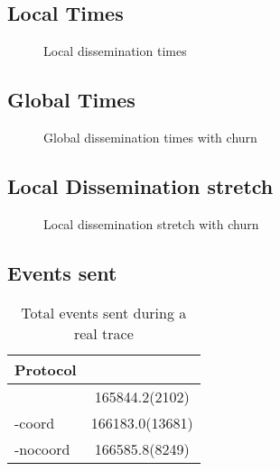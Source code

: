 \subsection{Local Times}
\label{sub:local-times}
\begin{figure}[htp]
	\centering
	
	\vspace{-2mm} 
	\caption{Local dissemination times}
	\vspace{-2mm}
	\label{fig:local-times-real-churn} 
\end{figure}

\newpage
\subsection{Global Times}

\begin{figure}[htp]
	\centering
	
	\vspace{-2mm} 
	\caption{Global dissemination times with churn}
	\vspace{-2mm} 
	\label{fig:global-times-real-churn} 
\end{figure}
\newpage
\subsection{Local Dissemination stretch}

\begin{figure}[htp]
	\centering
	
	\vspace{-2mm} 
	\caption{Local dissemination stretch with churn}
	\vspace{-2mm}
	\label{fig:local-delta-real-churn}   
\end{figure}
\newpage
\subsection{Events sent}
\begin{table}[htp]
	\centering
	\caption{Total events sent during a real trace}
\begin{tabular}{lS}
	\toprule
	Protocol & \\
	\midrule
	\epto & 165844.2(2102) \\
	\jgroups-coord & 166183.0(13681) \\
	\jgroups-nocoord & 166585.8(8249) \\
	\bottomrule
\end{tabular}
    \label{table:total-sent-real-churn}
\end{table}
%	
